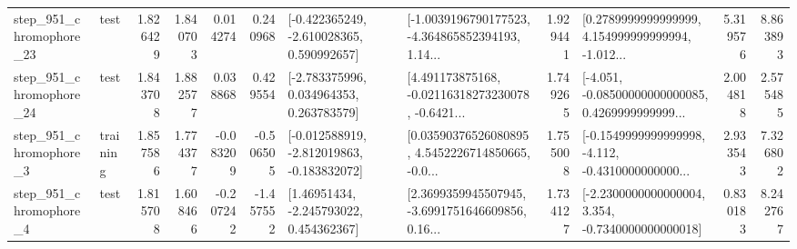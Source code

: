 \begin{tabular}{llrrrrllrlrr}
  step\_951\_chromophore\_23 &      test &      1.826429 &    1.840703 &      0.014274 &  0.240968 &   [-0.422365249, -2.610028365, 0.590992657] &  [-1.0039196790177523, -4.364865852394193, 1.14... &       1.929441 &  [0.2789999999999999, 4.154999999999994, -1.012... &            5.319576 &          8.863893 \\
  step\_951\_chromophore\_24 &      test &      1.843708 &    1.882577 &      0.038868 &  0.429554 &    [-2.783375996, 0.034964353, 0.263783579] &  [4.491173875168, -0.02116318273230078, -0.6421... &       1.749265 &  [-4.051, -0.08500000000000085, 0.4269999999999... &            2.004818 &          2.575485 \\
   step\_951\_chromophore\_3 &  training &      1.857586 &    1.774377 &     -0.083209 & -0.506505 &  [-0.012588919, -2.812019863, -0.183832072] &  [0.03590376526080895, 4.5452226714850665, -0.0... &       1.755008 &  [-0.1549999999999998, -4.112, -0.4310000000000... &            2.933543 &          7.326802 \\
   step\_951\_chromophore\_4 &      test &      1.815708 &    1.608466 &     -0.207242 & -1.457552 &     [1.46951434, -2.245793022, 0.454362367] &  [2.3699359945507945, -3.6991751646609856, 0.16... &       1.734127 &  [-2.2300000000000004, 3.354, -0.7340000000000018] &            0.830183 &          8.242767 \\
\bottomrule
\end{tabular}

